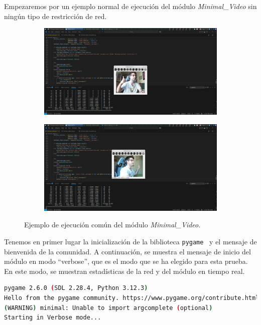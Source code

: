 Empezaremos por un ejemplo normal de ejecución del módulo \textit{Minimal\_Video} sin ningún tipo de restricción de red.
\begin{figure}
  \centering
  \begin{subfigure}{\textwidth}
    \centering
    \includegraphics[width=\textwidth,height=0.6\textheight,keepaspectratio]{images/pruebas/ejecuion_normal1.png}
  \end{subfigure}
  \vspace{\baselineskip}
  \begin{subfigure}{\textwidth}
    \centering
    \includegraphics[width=\textwidth,height=0.6\textheight,keepaspectratio]{images/pruebas/ejecuion_normal2.png}
  \end{subfigure}
  \caption{Ejemplo de ejecución común del módulo \textit{Minimal\_Video}.}
  \label{fig:ejecucion_doble}
\end{figure}
\vspace{\baselineskip}

\newpage

Tenemos en primer lugar la inicialización de la biblioteca \texttt{pygame}~\cite{pygame} y el mensaje de bienvenida de la comunidad. A continuación, se muestra el mensaje de inicio del módulo en modo ``verbose'', que es el modo que se ha elegido para esta prueba. En este modo, se muestran estadísticas de la red y del módulo en tiempo real.
\begin{lstlisting}[language=bash,basicstyle=\ttfamily\scriptsize]
pygame 2.6.0 (SDL 2.28.4, Python 3.12.3)
Hello from the pygame community. https://www.pygame.org/contribute.html
(WARNING) minimal: Unable to import argcomplete (optional)
Starting in Verbose mode...
\end{lstlisting}

